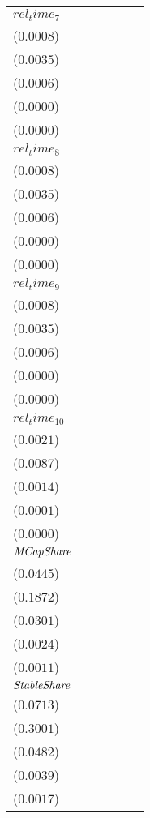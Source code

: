 \begin{tabular}{llllll}
$rel_time_7$        &   \makecell{$0.0018^{**}$ \\ ($0.0008$)} &    \makecell{$0.0058^{*}$ \\ ($0.0035$)} &  \makecell{$0.0016^{***}$ \\ ($0.0006$)} &   \makecell{$0.0001^{**}$ \\ ($0.0000$)} &     \makecell{$0.0000^{}$ \\ ($0.0000$)} \\
$rel_time_8$        &   \makecell{$0.0019^{**}$ \\ ($0.0008$)} &     \makecell{$0.0055^{}$ \\ ($0.0035$)} &  \makecell{$0.0024^{***}$ \\ ($0.0006$)} &  \makecell{$0.0002^{***}$ \\ ($0.0000$)} &   \makecell{$0.0000^{**}$ \\ ($0.0000$)} \\
$rel_time_9$        &  \makecell{$0.0029^{***}$ \\ ($0.0008$)} &  \makecell{$0.0115^{***}$ \\ ($0.0035$)} &  \makecell{$0.0025^{***}$ \\ ($0.0006$)} &  \makecell{$0.0002^{***}$ \\ ($0.0000$)} &  \makecell{$0.0001^{***}$ \\ ($0.0000$)} \\
$rel_time_10$       &     \makecell{$0.0020^{}$ \\ ($0.0021$)} &     \makecell{$0.0073^{}$ \\ ($0.0087$)} &    \makecell{$0.0026^{*}$ \\ ($0.0014$)} &     \makecell{$0.0002^{}$ \\ ($0.0001$)} &     \makecell{$0.0001^{}$ \\ ($0.0000$)} \\
${\it MCapShare}$   &  \makecell{$0.9138^{***}$ \\ ($0.0445$)} &  \makecell{$3.8388^{***}$ \\ ($0.1872$)} &    \makecell{$-0.0218^{}$ \\ ($0.0301$)} &    \makecell{$-0.0012^{}$ \\ ($0.0024$)} &     \makecell{$0.0005^{}$ \\ ($0.0011$)} \\
${\it StableShare}$ &  \makecell{$0.9909^{***}$ \\ ($0.0713$)} &  \makecell{$3.9002^{***}$ \\ ($0.3001$)} &  \makecell{$1.0927^{***}$ \\ ($0.0482$)} &  \makecell{$0.0886^{***}$ \\ ($0.0039$)} &  \makecell{$0.0344^{***}$ \\ ($0.0017$)} \\

\end{tabular}
